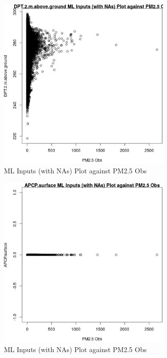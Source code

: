 \begin{figure} 
\centering  
\includegraphics[width=0.77\textwidth]{Code_Outputs/Report_ML_input_PM25_Step4_part_e_de_duplicated_aves_compiled_2019-05-20wNAs_DPT2mabovegroundvPM25_Obs.jpg} 
\caption{\label{fig:Report_ML_input_PM25_Step4_part_e_de_duplicated_aves_compiled_2019-05-20wNAsDPT2mabovegroundvPM25_Obs}ML Inputs (with NAs) Plot against PM2.5 Obs} 
\end{figure} 
 

\begin{figure} 
\centering  
\includegraphics[width=0.77\textwidth]{Code_Outputs/Report_ML_input_PM25_Step4_part_e_de_duplicated_aves_compiled_2019-05-20wNAs_APCPsurfacevPM25_Obs.jpg} 
\caption{\label{fig:Report_ML_input_PM25_Step4_part_e_de_duplicated_aves_compiled_2019-05-20wNAsAPCPsurfacevPM25_Obs}ML Inputs (with NAs) Plot against PM2.5 Obs} 
\end{figure} 
 

